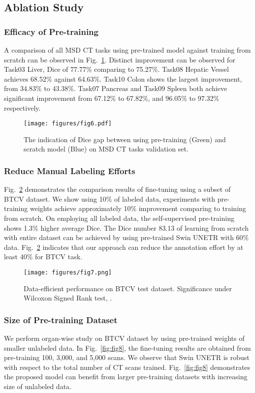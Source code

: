 \documentclass[10pt,twocolumn,letterpaper]{article}
\begin{document}
\subsection{Ablation Study}
\subsubsection{Efficacy of Pre-training}
A comparison of all MSD CT tasks using pre-trained model against training from scratch can be observed in Fig.~\ref{fig:fig6}. Distinct improvement can be observed for Task03 Liver, Dice of 77.77\% comparing to 75.27\%. Task08 Hepatic Vessel achieves 68.52\% against 64.63\%. Task10 Colon shows the largest improvement, from 34.83\% to 43.38\%. Task07 Pancreas and Task09 Spleen both achieve significant improvement from 67.12\% to 67.82\%, and 96.05\% to 97.32\% respectively. 


\begin{figure}[t]
\texttt{[image: figures/fig6.pdf]}
\caption{The indication of Dice gap between using pre-training (Green) and scratch model (Blue) on MSD CT tasks validation set.}
  \label{fig:fig6}
\end{figure}
\subsubsection{Reduce Manual Labeling Efforts}
Fig.~\ref{fig:fig7} demonstrates the comparison results of fine-tuning using a subset of BTCV dataset. We show using 10\% of labeled data, experiments with pre-training weights achieve approximately 10\% improvement comparing to training from scratch. On employing all labeled data, the self-supervised pre-training shows 1.3\% higher average Dice. The Dice number 83.13 of learning from scratch with entire dataset can be achieved by using pre-trained Swin UNETR with 60\% data. Fig.~\ref{fig:fig7} indicates that our approach can reduce the annotation effort by at least 40\% for BTCV task. 
\begin{figure}[t]
\texttt{[image: figures/fig7.png]}
\caption{Data-efficient performance on BTCV test dataset. Significance under Wilcoxon Signed Rank test, .}
  \label{fig:fig7}
\end{figure}
\subsubsection{Size of Pre-training Dataset}
We perform organ-wise study on BTCV dataset by using pre-trained weights of smaller unlabeled data. In  Fig.~\ref{fig:fig8}, the fine-tuning results are obtained from pre-training 100, 3,000, and 5,000 scans. We observe that Swin UNETR is robust with respect to the total number of CT scans trained.  Fig.~\ref{fig:fig8} demonstrates the proposed model can benefit from larger pre-training datasets with increasing size of unlabeled data.
\end{document}
